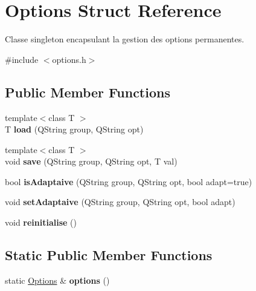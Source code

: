 \hypertarget{struct_options}{\section{\-Options \-Struct \-Reference}
\label{struct_options}
}


\-Classe singleton encapsulant la gestion des options permanentes.  




{\ttfamily \#include $<$options.\-h$>$}

\subsection*{\-Public \-Member \-Functions}
\begin{DoxyCompactItemize}
\item 
\hypertarget{struct_options_ada32d485296bd6ba73a1d95bd6260c1a}{{\footnotesize template$<$class T $>$ }\\\-T {\bfseries load} (\-Q\-String group, \-Q\-String opt)}\label{struct_options_ada32d485296bd6ba73a1d95bd6260c1a}

\item 
\hypertarget{struct_options_ad20146ff9544f6229bb1696ea5bf643d}{{\footnotesize template$<$class T $>$ }\\void {\bfseries save} (\-Q\-String group, \-Q\-String opt, \-T val)}\label{struct_options_ad20146ff9544f6229bb1696ea5bf643d}

\item 
\hypertarget{struct_options_aba5eff71e572b7ad128d4d6bfe08c2a0}{bool {\bfseries is\-Adaptaive} (\-Q\-String group, \-Q\-String opt, bool adapt=true)}\label{struct_options_aba5eff71e572b7ad128d4d6bfe08c2a0}

\item 
\hypertarget{struct_options_a361246da59f7ad9db32231b7f45e3d52}{void {\bfseries set\-Adaptaive} (\-Q\-String group, \-Q\-String opt, bool adapt)}\label{struct_options_a361246da59f7ad9db32231b7f45e3d52}

\item 
\hypertarget{struct_options_a2b6e8d3c060239499fd9a84e6de45393}{void {\bfseries reinitialise} ()}\label{struct_options_a2b6e8d3c060239499fd9a84e6de45393}

\end{DoxyCompactItemize}
\subsection*{\-Static \-Public \-Member \-Functions}
\begin{DoxyCompactItemize}
\item 
\hypertarget{struct_options_aa3dd7609fbc5d54af65992632bff842a}{static \hyperlink{struct_options}{\-Options} \& {\bfseries options} ()}\label{struct_options_aa3dd7609fbc5d54af65992632bff842a}

\end{DoxyCompactItemize}



